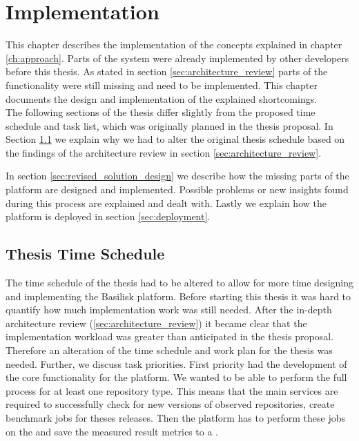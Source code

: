 \chapter{Implementation}
\label{ch:implementation}



This chapter describes the implementation of the concepts explained in chapter \ref{ch:approach}.
Parts of the system were already implemented by other developers before this thesis.
As stated in section \ref{sec:architecture_review} parts of the functionality were still missing and need to be implemented.
This chapter documents the design and implementation of the explained shortcomings.
\\

The following sections of the thesis differ slightly from the proposed time schedule and task list, which was originally planned in the thesis proposal.
In Section \ref{sec:time_schedule} we explain why we had to alter the original thesis schedule based on the findings of the architecture review in section \ref{sec:architecture_review}.

In section \ref{sec:revised_solution_design} we describe how the missing parts of the platform are designed and implemented.
Possible problems or new insights found during this process are explained and dealt with.
Lastly we explain how the platform is deployed in section \ref{sec:deployment}.



\section{Thesis Time Schedule}
\label{sec:time_schedule}
The time schedule of the thesis had to be altered to allow for more time designing and implementing the Basilisk platform.
Before starting this thesis it was hard to quantify how much implementation work was still needed.
After the in-depth architecture review (\ref{sec:architecture_review}) it became clear that the implementation workload was greater than anticipated in the thesis proposal.
Therefore an alteration of the time schedule and work plan for the thesis was needed.
Further, we discuss task priorities.
First priority had the development of the core functionality for the platform.
We wanted to be able to perform the full process for at least one repository type.
This means that the main services are required to successfully check for new versions of observed repositories, create benchmark jobs for theses releases. 
Then the platform has to perform these jobs on the \tsp{} and save the measured result metrics to a \ts{}.

